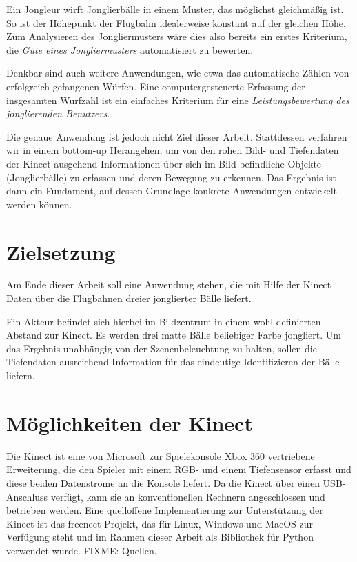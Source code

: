 \documentclass[12pt,a4paper,ngerman]{scrartcl}
\begin{document}
Ein Jongleur wirft Jonglierbälle in einem Muster, das möglichst gleichmäßig ist.
So ist der Höhepunkt der Flugbahn idealerweise konstant auf der gleichen Höhe.
Zum Analysieren des Jongliermusters wäre dies also bereits ein erstes Kriterium, 
die \textit{Güte eines Jongliermusters} automatisiert zu bewerten.

Denkbar sind auch weitere Anwendungen, wie etwa das automatische Zählen von 
erfolgreich gefangenen Würfen. Eine computergesteuerte Erfassung der insgesamten
Wurfzahl ist ein einfaches Kriterium für eine \textit{Leistungsbewertung des 
jonglierenden Benutzers}.

Die genaue Anwendung ist jedoch nicht Ziel dieser Arbeit. Stattdessen verfahren wir
in einem bottom-up Herangehen, um von den rohen Bild- und Tiefendaten der Kinect 
ausgehend Informationen über sich im Bild befindliche Objekte (Jonglierbälle) zu
erfassen und deren Bewegung zu erkennen. Das Ergebnis ist dann ein Fundament, auf
dessen Grundlage konkrete Anwendungen entwickelt werden können.

\section{Zielsetzung}

Am Ende dieser Arbeit soll eine Anwendung stehen, die mit Hilfe der Kinect Daten 
über die Flugbahnen dreier jonglierter Bälle liefert. 

Ein Akteur befindet sich hierbei im Bildzentrum in einem wohl definierten Abstand 
zur Kinect. Es werden drei matte Bälle beliebiger Farbe jongliert. Um das Ergebnis
unabhängig von der Szenenbeleuchtung zu halten, sollen die Tiefendaten ausreichend
Information für das eindeutige Identifizieren der Bälle liefern.

\section{Möglichkeiten der Kinect}

Die Kinect ist eine von Microsoft zur Spielekonsole Xbox 360 vertriebene Erweiterung,
die den Spieler mit einem RGB- und einem Tiefensensor erfasst und diese beiden 
Datenströme an die Konsole liefert. Da die Kinect über einen USB-Anschluss verfügt,
kann sie an konventionellen Rechnern angeschlossen und betrieben werden. Eine 
quelloffene Implementierung zur Unterstützung der Kinect ist das freenect Projekt,
das für Linux, Windows und MacOS zur Verfügung steht und im Rahmen dieser Arbeit
als Bibliothek für Python verwendet wurde. FIXME: Quellen.
\end{document}
